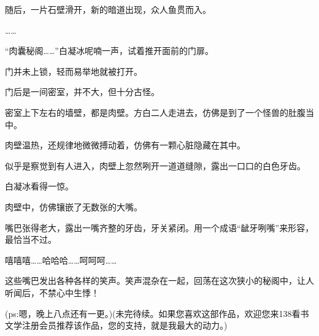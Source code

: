 \begin{this_body}
随后，一片石壁滑开，新的暗道出现，众人鱼贯而入。

……

“肉囊秘阁……”白凝冰呢喃一声，试着推开面前的门扉。

门并未上锁，轻而易举地就被打开。

门后是一间密室，并不大，但十分古怪。

密室上下左右的墙壁，都是肉壁。方白二人走进去，仿佛是到了一个怪兽的肚腹当中。

肉壁温热，还规律地微微搏动着，仿佛有一颗心脏隐藏在其中。

似乎是察觉到有人进入，肉壁上忽然咧开一道道缝隙，露出一口口的白色牙齿。

白凝冰看得一惊。

肉壁中，仿佛镶嵌了无数张的大嘴。

嘴巴张得老大，露出一嘴齐整的牙齿，牙关紧闭。用一个成语“龇牙咧嘴”来形容，最恰当不过。

嘻嘻嘻……哈哈哈……呵呵呵……

这些嘴巴发出各种各样的笑声。笑声混杂在一起，回荡在这次狭小的秘阁中，让人听闻后，不禁心中生悸！

(ps:嗯，晚上八点还有一更。)(未完待续。如果您喜欢这部作品，欢迎您来138看书文学注册会员推荐该作品，您的支持，就是我最大的动力。)

\end{this_body}

